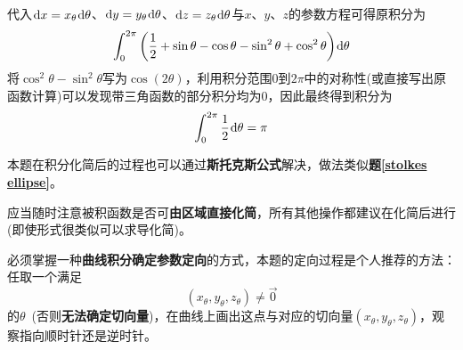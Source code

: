 \documentclass[a4paper,UTF8,fontset=windows,AutoFakeBold]{ctexart}
\newcommand*{\dr}{\hspace{0.07em}\mathrm{d}}
\newcommand*{\note}{\noindent *}
\theoremstyle{ex}
\newcommand{\exref}[1]{\textbf{题\;\ref{#1}\;}}
\begin{document}
\begin{framed}
{\begin{itemize}
        代入$\dr x=x_\theta\dr\theta$、$\dr y=y_\theta\dr\theta$、$\dr z=z_\theta\dr\theta$与$x$、$y$、$z$的参数方程可得原积分为
        $$\int_0^{2\pi}\bigg(\frac{1}{2}+\sin\theta-\cos\theta-\sin^2\theta+\cos^2\theta\bigg)\dr\theta$$
        将$\cos^2\theta-\sin^2\theta$写为$\cos(2\theta)$，利用积分范围0到$2\pi$中的对称性(或直接写出原函数计算)可以发现带三角函数的部分积分均为0，因此最终得到积分为
        $$\int_0^{2\pi}\frac{1}{2}\dr\theta=\pi$$
    \end{itemize}

    \note 本题在积分化简后的过程也可以通过\textbf{斯托克斯公式}解决，做法类似\exref{stolkes ellipse}。
}
\end{framed}

\note 应当随时注意被积函数是否可\textbf{由区域直接化简}，所有其他操作都建议在化简后进行(即使形式很类似可以求导化简)。

\note 必须掌握一种\textbf{曲线积分确定参数定向}的方式，本题的定向过程是个人推荐的方法：任取一个满足
$$(x_\theta,y_\theta,z_\theta)\ne\vec{0}$$
的$\theta$\ (否则\textbf{无法确定切向量})，在曲线上画出这点与对应的切向量$(x_\theta,y_\theta,z_\theta)$，观察指向顺时针还是逆时针。
\end{document}
